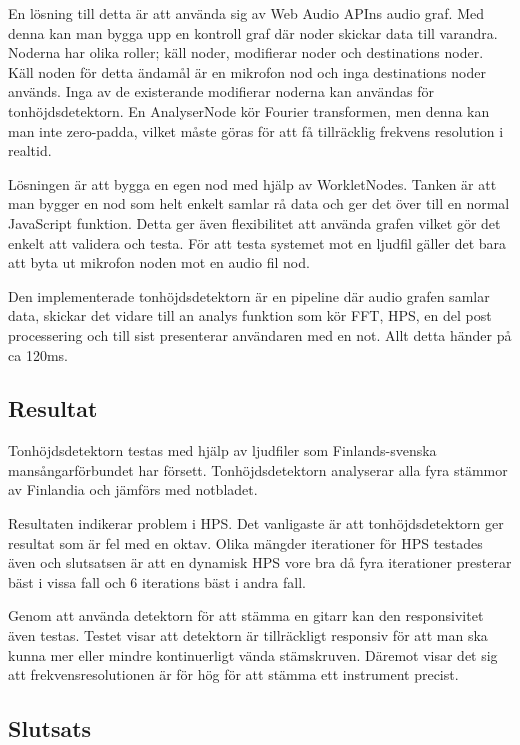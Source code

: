 En lösning till detta är att använda sig av Web Audio APIns audio graf. Med denna kan man bygga upp en kontroll graf där noder skickar data till varandra. Noderna har olika roller; käll noder, modifierar noder och destinations noder. Käll noden för detta ändamål är en mikrofon nod och inga destinations noder används. Inga av de existerande modifierar noderna kan användas för tonhöjdsdetektorn. En AnalyserNode kör Fourier transformen, men denna kan man inte zero-padda, vilket måste göras för att få tillräcklig frekvens resolution i realtid. 

Lösningen är att bygga en egen nod med hjälp av WorkletNodes. Tanken är att man bygger en nod som helt enkelt samlar rå data och ger det över till en normal JavaScript funktion. Detta ger även flexibilitet att använda grafen vilket gör det enkelt att validera och testa. För att testa systemet mot en ljudfil gäller det bara att byta ut mikrofon noden mot en audio fil nod.  

Den implementerade tonhöjdsdetektorn är en pipeline där audio grafen samlar data, skickar det vidare till an analys funktion som kör FFT, HPS, en del post processering och till sist presenterar användaren med en not. Allt detta händer på ca 120ms. 

\subsection*{Resultat}
Tonhöjdsdetektorn testas med hjälp av ljudfiler som Finlands-svenska mansångarförbundet har försett. Tonhöjdsdetektorn analyserar alla fyra stämmor av Finlandia och jämförs med notbladet. 

Resultaten indikerar problem i HPS. Det vanligaste är att tonhöjdsdetektorn ger resultat som är fel med en oktav. Olika mängder iterationer för HPS testades även och slutsatsen är att en dynamisk HPS vore bra då fyra iterationer presterar bäst i vissa fall och 6 iterations bäst i andra fall.

Genom att använda detektorn för att stämma en gitarr kan den responsivitet även testas. Testet visar att detektorn är tillräckligt responsiv för att man ska kunna mer eller mindre kontinuerligt vända stämskruven. Däremot visar det sig att frekvensresolutionen är för hög för att stämma ett instrument precist. 

\subsection*{Slutsats}
